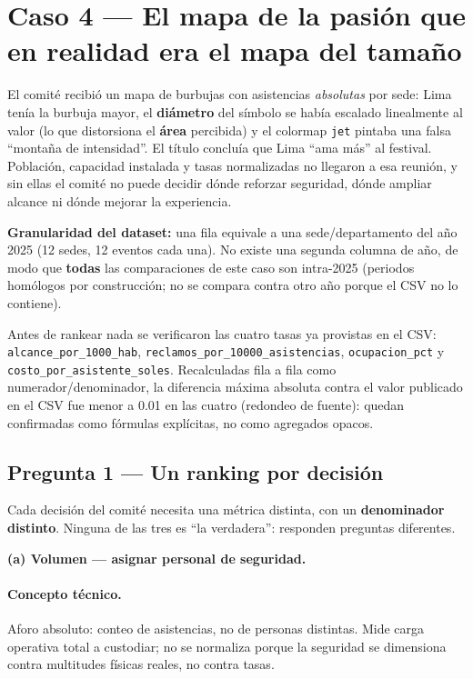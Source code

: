 \section{Caso 4 --- El mapa de la pasión que en realidad era el mapa del tamaño}
\label{sec:caso4}

El comité recibió un mapa de burbujas con asistencias \emph{absolutas} por sede: Lima tenía la burbuja mayor, el \textbf{diámetro} del símbolo se había escalado linealmente al valor (lo que distorsiona el \textbf{área} percibida) y el colormap \texttt{jet} pintaba una falsa ``montaña de intensidad''. El título concluía que Lima ``ama más'' al festival. Población, capacidad instalada y tasas normalizadas no llegaron a esa reunión, y sin ellas el comité no puede decidir dónde reforzar seguridad, dónde ampliar alcance ni dónde mejorar la experiencia.

\textbf{Granularidad del dataset:} una fila equivale a una sede/departamento del año 2025 (12 sedes, 12 eventos cada una). No existe una segunda columna de año, de modo que \textbf{todas} las comparaciones de este caso son intra-2025 (periodos homólogos por construcción; no se compara contra otro año porque el CSV no lo contiene).

Antes de rankear nada se verificaron las cuatro tasas ya provistas en el CSV: \texttt{alcance\_por\_1000\_hab}, \texttt{reclamos\_por\_10000\_asistencias}, \texttt{ocupacion\_pct} y \texttt{costo\_por\_asistente\_soles}. Recalculadas fila a fila como numerador/denominador, la diferencia máxima absoluta contra el valor publicado en el CSV fue menor a 0.01 en las cuatro (redondeo de fuente): quedan confirmadas como fórmulas explícitas, no como agregados opacos.

\subsection{Pregunta 1 --- Un ranking por decisión}
\label{ssec:c4-q1}

Cada decisión del comité necesita una métrica distinta, con un \textbf{denominador distinto}. Ninguna de las tres es ``la verdadera'': responden preguntas diferentes.

\textbf{(a) Volumen --- asignar personal de seguridad.}

\paragraph{Concepto técnico.} Aforo absoluto: conteo de asistencias, no de personas distintas. Mide carga operativa total a custodiar; no se normaliza porque la seguridad se dimensiona contra multitudes físicas reales, no contra tasas.

